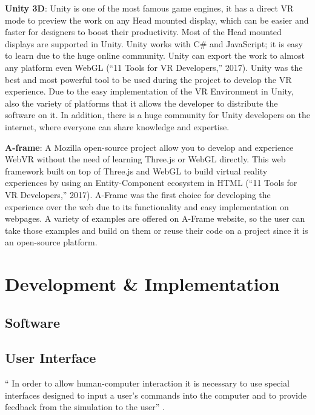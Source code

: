 \textbf{Unity 3D}: Unity is one of the most famous game engines, it has a direct VR mode to preview
the work on any Head mounted display, which can be easier and faster for designers to boost
their productivity. Most of the Head mounted displays are supported in Unity. Unity works
with C\# and JavaScript; it is easy to learn due to the huge online community. Unity can export
the work to almost any platform even WebGL (“11 Tools for VR Developers,” 2017). Unity was
the best and most powerful tool to be used during the project to develop the VR experience.
Due to the easy implementation of the VR Environment in Unity, also the variety of platforms
that it allows the developer to distribute the software on it. In addition, there is a huge
community for Unity developers on the internet, where everyone can share knowledge and
expertise.


\textbf{A-frame}: A Mozilla open-source project allow you to develop and experience WebVR without
the need of learning Three.js or WebGL directly. This web framework built on top of Three.js
and WebGL to build virtual reality experiences by using an Entity-Component ecosystem in
HTML (“11 Tools for VR Developers,” 2017). A-Frame was the first choice for developing the
experience over the web due to its functionality and easy implementation on webpages. A
variety of examples are offered on A-Frame website, so the user can take those examples and
build on them or reuse their code on a project since it is an open-source platform.


\section{Development \& Implementation}

\subsection{Software}

\subsection{User Interface}

“ In order to allow human-computer interaction it is necessary to use special interfaces designed to input a user's commands into the computer and to provide feedback from the simulation to the user” \citep{burdea2017virtual}.